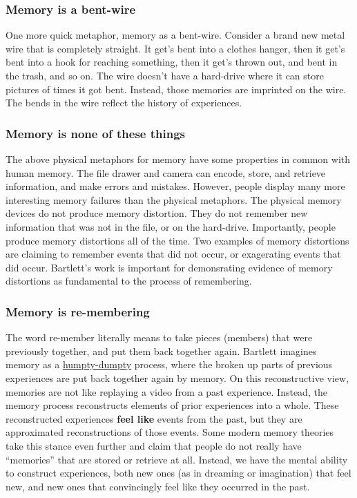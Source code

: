 \documentclass[
  oneside,
  12pt]{crumpbook}
\begin{document}
\hypertarget{memory-is-a-bent-wire}{%
\subsubsection{Memory is a bent-wire}\label{memory-is-a-bent-wire}}

One more quick metaphor, memory as a bent-wire. Consider a brand new metal wire that is completely straight. It get's bent into a clothes hanger, then it get's bent into a hook for reaching something, then it get's thrown out, and bent in the trash, and so on. The wire doesn't have a hard-drive where it can store pictures of times it got bent. Instead, those memories are imprinted on the wire. The bends in the wire reflect the history of experiences.

\hypertarget{memory-is-none-of-these-things}{%
\subsubsection{Memory is none of these things}\label{memory-is-none-of-these-things}}

The above physical metaphors for memory have some properties in common with human memory. The file drawer and camera can encode, store, and retrieve information, and make errors and mistakes. However, people display many more interesting memory failures than the physical metaphors. The physical memory devices do not produce memory distortion. They do not remember new information that was not in the file, or on the hard-drive. Importantly, people produce memory distortions all of the time. Two examples of memory distortions are claiming to remember events that did not occur, or exagerating events that did occur. Bartlett's work is important for demonsrating evidence of memory distortions as fundamental to the process of remembering.

\hypertarget{memory-is-re-membering}{%
\subsubsection{Memory is re-membering}\label{memory-is-re-membering}}

The word re-member literally means to take pieces (members) that were previously together, and put them back together again. Bartlett imagines memory as a \href{https://en.wikipedia.org/wiki/Humpty_Dumpty}{humpty-dumpty} process, where the broken up parts of previous experiences are put back together again by memory. On this reconstructive view, memories are not like replaying a video from a past experience. Instead, the memory process reconstructs elements of prior experiences into a whole. These reconstructed experiences \textbf{feel like} events from the past, but they are approximated reconstructions of those events. Some modern memory theories take this stance even further and claim that people do not really have ``memories'' that are stored or retrieve at all. Instead, we have the mental ability to construct experiences, both new ones (as in dreaming or imagination) that feel new, and new ones that convincingly feel like they occurred in the past.
\end{document}
